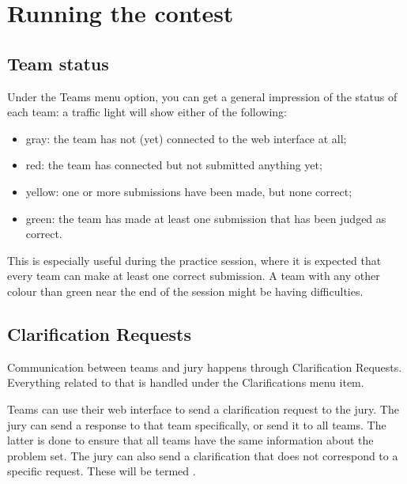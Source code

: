 \documentclass[a4paper,10pt,english,openany]{sphinxmanual}
\begin{document}
\sphinxstepscope


\section{Running the contest}
\label{\detokenize{running:running-the-contest}}\label{\detokenize{running::doc}}

\subsection{Team status}
\label{\detokenize{running:team-status}}
\sphinxAtStartPar
Under the Teams menu option, you can get a general impression of the
status of each team: a traffic light will show either of the
following:
\begin{itemize}
\item {} 
\sphinxAtStartPar
gray: the team has not (yet) connected to the web interface at all;

\item {} 
\sphinxAtStartPar
red: the team has connected but not submitted anything yet;

\item {} 
\sphinxAtStartPar
yellow: one or more submissions have been made, but none correct;

\item {} 
\sphinxAtStartPar
green: the team has made at least one submission that has
been judged as correct.

\end{itemize}

\sphinxAtStartPar
This is especially useful during the practice session, where it is
expected that every team can make at least one correct submission. A
team with any other colour than green near the end of the session
might be having difficulties.


\subsection{Clarification Requests}
\label{\detokenize{running:clarification-requests}}\label{\detokenize{running:clarifications}}
\sphinxAtStartPar
Communication between teams and jury happens through Clarification
Requests. Everything related to that is handled under the
Clarifications menu item.

\sphinxAtStartPar
Teams can use their web interface to send a clarification request to
the jury. The jury can send a response to that team specifically, or
send it to all teams. The latter is done to ensure that all teams have
the same information about the problem set. The jury can also send a
clarification that does not correspond to a specific request. These
will be termed .
\end{document}
